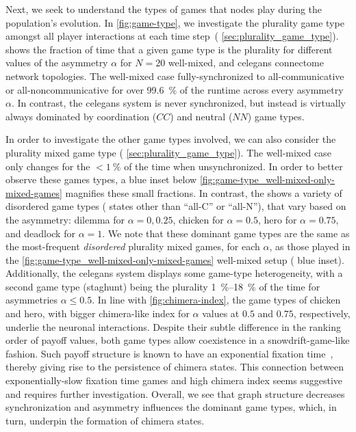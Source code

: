 \documentclass[pdflatex,lineno,referee,sn-nature]{sn-jnl}
\begin{document}
Next, we seek to understand the types of games
that nodes play during the population's evolution.
In \cref{fig:game-type}, we investigate the plurality game type
amongst all player interactions at each time step~(\cf{} \cref{sec:plurality_game_type}).
 shows the fraction of time
that a given game type is the plurality for different values
of the asymmetry $\alpha$ for
$N=20$ well-mixed,
and
\gls{celegans} connectome
network topologies.
The  well-mixed case
fully-synchronized to all-communicative or all-noncommunicative
for over \SI{99.6}{\percent} of the runtime
across every asymmetry $\alpha$.
In contrast, the
 \gls{celegans} system
is never synchronized, but instead is virtually always dominated by
coordination ($CC$) and neutral ($NN$) game types.

In order to investigate the other game types involved,
we can also consider the plurality mixed game type
(\cf{} \cref{sec:plurality_game_type}).
The  well-mixed case
only changes for the $< \SI{1}{\percent}$ of the time when unsynchronized.
In order to better observe these games types,
a blue inset below \cref{fig:game-type_well-mixed-only-mixed-games}
magnifies these small fractions.
In contrast, the 
shows a variety of disordered game types
(\ie{} states other than ``all-C'' or ``all-N''),
that vary based on the asymmetry:
dilemma for $\alpha = 0, 0.25$, chicken for $\alpha = 0.5$,
hero for $\alpha = 0.75$, and deadlock for $\alpha = 1$.
We note that these dominant game types
are the same as the most-frequent \emph{disordered} plurality mixed games,
for each $\alpha$, as those played in
the \cref{fig:game-type_well-mixed-only-mixed-games}
well-mixed setup (\cf{} blue inset).
Additionally, the \gls{celegans} system displays
some game-type heterogeneity, with
a second game type (staghunt) being the plurality
\SIrange{1}{18}{\percent} of the time
for asymmetries $\alpha \le 0.5$.
In line with \cref{fig:chimera-index}, the game types of chicken and hero,
with bigger chimera-like index for $\alpha$ values at $0.5$ and $0.75$, respectively,
underlie the neuronal interactions.
Despite their subtle difference in the ranking order of payoff values,
both game types allow coexistence in a snowdrift-game-like fashion.
Such payoff structure is known to have
an exponential fixation time~\citep{antal2006fixation},
thereby giving rise to the persistence of chimera states.
This connection between exponentially-slow fixation time games and high chimera index
seems suggestive and requires further investigation.
Overall, we see that graph structure decreases synchronization
and asymmetry influences the dominant game types, which, in turn,
underpin the formation of chimera states.
\end{document}
